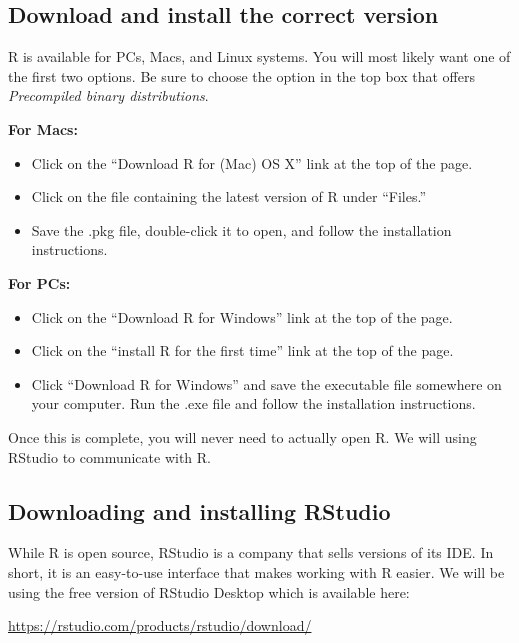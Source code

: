 \documentclass[
]{book}
\begin{document}
\hypertarget{download-and-install-the-correct-version}{%
\subsection{Download and install the correct version}\label{download-and-install-the-correct-version}}

R is available for PCs, Macs, and Linux systems. You will most likely want one of the first two options. Be sure to choose the option in the top box that offers \emph{Precompiled binary distributions}.

\textbf{For Macs:}

\begin{itemize}
\item
  Click on the ``Download R for (Mac) OS X'' link at the top of the page.
\item
  Click on the file containing the latest version of R under ``Files.''
\item
  Save the .pkg file, double-click it to open, and follow the installation instructions.
\end{itemize}

\textbf{For PCs:}

\begin{itemize}
\item
  Click on the ``Download R for Windows'' link at the top of the page.
\item
  Click on the ``install R for the first time'' link at the top of the page.
\item
  Click ``Download R for Windows'' and save the executable file somewhere on your computer. Run the .exe file and follow the installation instructions.
\end{itemize}

Once this is complete, you will never need to actually open R. We will using RStudio to communicate with R.

\hypertarget{downloading-and-installing-rstudio}{%
\subsection{Downloading and installing RStudio}\label{downloading-and-installing-rstudio}}

While R is open source, RStudio is a company that sells versions of its IDE. In short, it is an easy-to-use interface that makes working with R easier. We will be using the free version of RStudio Desktop which is available here:

\url{https://rstudio.com/products/rstudio/download/}
\end{document}
